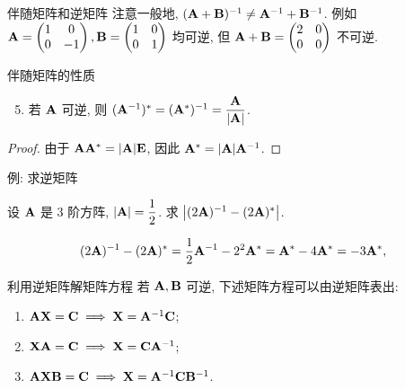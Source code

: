 \begin{frame}{伴随矩阵和逆矩阵}
	\onslide<+->
	注意一般地, $({\mathbf{A}}+{\mathbf{B}})^{-1}\neq{\mathbf{A}}^{-1}+{\mathbf{B}}^{-1}$.
	\onslide<+->
	例如 ${\mathbf{A}}=\begin{pmatrix}
		1&0\\0&-1
	\end{pmatrix},{\mathbf{B}}=\begin{pmatrix}
		1&0\\0&1
	\end{pmatrix}$ 均可逆, 但 ${\mathbf{A}}+{\mathbf{B}}=\begin{pmatrix}
		2&0\\0&0
	\end{pmatrix}$ 不可逆.
	\onslide<+->
	\begin{block}{伴随矩阵的性质}
		\begin{enumerate}
			\setcounter{enumi}{4}
			\item 若 ${\mathbf{A}}$ 可逆, 则 $({\mathbf{A}}^{-1})^*=({\mathbf{A}}^*)^{-1}=\dfrac{{\mathbf{A}}}{|{\mathbf{A}}|}$.
		\end{enumerate}
	\end{block}
	\onslide<+->
	\begin{proof}
		由于 ${\mathbf{A}}{\mathbf{A}}^*=|{\mathbf{A}}|{\mathbf{E}}$, 因此 ${\mathbf{A}}^*=|{\mathbf{A}}|{\mathbf{A}}^{-1}$.
		\onslide<+->{于是
		\[(\bfA^{-1})^*=|\bfA^{-1}|(\bfA^{-1})^{-1}=\frac{\bfA}{|\bfA|},\quad\visible<+->{(\bfA^*)^{-1}=(|\bfA|\bfA^{-1})^{-1}=\frac{\bfA}{|\bfA|}.}\qedhere\]
		}
		\vspace{-\baselineskip}
	\end{proof}
\end{frame}


\begin{frame}{例: 求逆矩阵}
	\onslide<+->
	\begin{example}
		设 ${\mathbf{A}}$ 是 $3$ 阶方阵, $|{\mathbf{A}}|=\dfrac12$.
		求 $\bigl|(2{\mathbf{A}})^{-1}-(2{\mathbf{A}})^*\bigr|$.
	\end{example}
	\onslide<+->
	\begin{solution}
		\[(2{\mathbf{A}})^{-1}-(2{\mathbf{A}})^*
		=\frac12{\mathbf{A}}^{-1}-2^2{\mathbf{A}}^*={\mathbf{A}}^*-4{\mathbf{A}}^*=-3{\mathbf{A}}^*,\]
		\onslide<+->{因此
		\[\bigl|(2\bfA)^{-1}-(2\bfA)^*\bigr|=-27|\bfA^*|=-27|\bfA|^2=-\frac{27}4.\]
		}
		\vspace{-\baselineskip}
	\end{solution}
\end{frame}


\begin{frame}{利用逆矩阵解矩阵方程}
	\onslide<+->
	若 ${\mathbf{A}},{\mathbf{B}}$ 可逆, 下述矩阵方程可以由逆矩阵表出:
	\begin{enumerate}
		\item ${\mathbf{A}}{\mathbf{X}}={\mathbf{C}}\implies {\mathbf{X}}={\mathbf{A}}^{-1}{\mathbf{C}}$;
		\item ${\mathbf{X}}{\mathbf{A}}={\mathbf{C}}\implies {\mathbf{X}}={\mathbf{C}}{\mathbf{A}}^{-1}$;
		\item ${\mathbf{A}}{\mathbf{X}}{\mathbf{B}}={\mathbf{C}}\implies {\mathbf{X}}={\mathbf{A}}^{-1}{\mathbf{C}}{\mathbf{B}}^{-1}$.
	\end{enumerate}
\end{frame}


